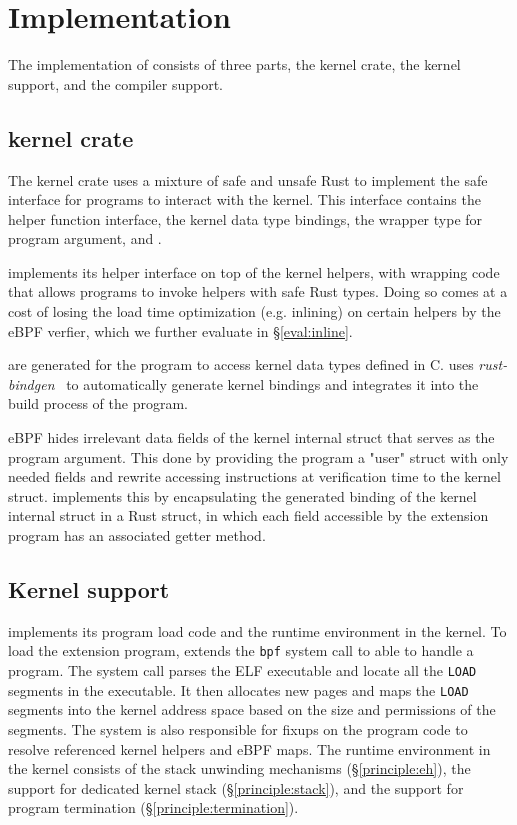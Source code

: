 \section{Implementation}
\label{sec:impl}
The implementation of \projname{} consists of three parts, the \projname{}
    kernel crate, the kernel support, and the compiler support.

\subsection{\projname{} kernel crate}
\label{impl:kernel-crate}
The kernel crate uses a mixture of safe and unsafe Rust to implement the safe
    interface for \projname{} programs to interact with the kernel.
This interface contains the helper function interface, the kernel data type
    bindings, the wrapper type for program argument, and .

\projname{} implements its helper interface on top of the kernel helpers, with
    wrapping code that allows programs to invoke helpers with safe Rust types.
Doing so comes at a cost of losing the load time optimization (e.g. inlining) on
    certain helpers by the eBPF verfier, which we further evaluate in
    \S\ref{eval:inline}.

 are generated for the program to access kernel
    data types defined in C.
\projname{} uses \emph{rust-bindgen}~\cite{bindgen} to automatically generate
    kernel bindings and integrates it into the build process of the program.

eBPF hides irrelevant data fields of the kernel internal struct that serves as
    the program argument.
This done by providing the program a "user" struct with only needed fields and
    rewrite accessing instructions at verification time to the kernel struct.
\projname{} implements this by encapsulating the generated binding of the
    kernel internal struct in a Rust struct, in which each field accessible by
    the extension program has an associated getter method.

\subsection{Kernel support}
\label{impl:kernel}
\projname{} implements its program load code and the runtime environment in the
    kernel.
To load the extension program, \projname{} extends the \texttt{bpf} system
    call to able to handle a \projname{} program.
The system call parses the ELF executable and locate all the \texttt{LOAD}
    segments in the executable.
It then allocates new pages and maps the \texttt{LOAD} segments into the kernel
    address space based on the size and permissions of the segments.
The system is also responsible for fixups on the program code to resolve
    referenced kernel helpers and eBPF maps.
The \projname{} runtime environment in the kernel consists of the stack
    unwinding mechanisms (\S\ref{principle:eh}), the support for dedicated
    kernel stack (\S\ref{principle:stack}), and the support for program
    termination (\S\ref{principle:termination}).

